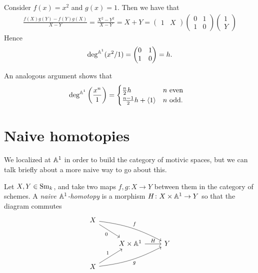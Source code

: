\documentclass[11pt,openany]{book}
\begin{document}
\begin{example} Consider $f(x) = x^2$ and $g(x) = 1$. Then we have that
\begin{align*}
    \frac{f(X)g(Y) -f(Y)g(X)}{X-Y} = \frac{X^2 - Y^2}{X-Y} = X + Y = \begin{pmatrix} 1 & X \end{pmatrix} \begin{pmatrix} 0 & 1 \\ 1 & 0 \end{pmatrix} \begin{pmatrix} 1 \\ Y \end{pmatrix} 
\end{align*}
Hence
\begin{align*}
    \deg^{\mathbb{A}^1}(x^2/1) = \begin{pmatrix} 0 & 1 \\ 1 & 0 \end{pmatrix} = h.
\end{align*}
\end{example}

\begin{corollary} An analogous argument shows that
\begin{align*}
    \deg^{\mathbb{A}^1} \left( \frac{x^n}{1} \right) &= \begin{cases} \frac{n}{2}h & n\text{ even} \\ \frac{n-1}{2}h + \left\langle 1 \right\rangle & n\text{ odd.} \end{cases}
\end{align*}
\end{corollary}

\section{Naive homotopies}

We localized at $\mathbb{A}^1$ in order to build the category of motivic spaces, but we can talk briefly about a more naive way to go about this.

\begin{definition} Let $X,Y \in \mathrm{Sm}_k$, and take two maps $f,g \colon X \to Y$ between them in the category of schemes. A \textit{naive $\mathbb{A}^1$-homotopy} is a morphism $H \colon X \times \mathbb{A}^1 \to Y$ so that the diagram commutes
\[\begin{tikzcd}
    X\ar[drr,"f" above right, bend left=10]\ar[dr,"0" below left] &  & \\
     & X \times \A^1\rar["H"] & Y\\
    X\ar[urr,"g" below right,bend right=10]\ar[ur,"1"] &  & 
\end{tikzcd} \]
\end{definition}
\end{document}
